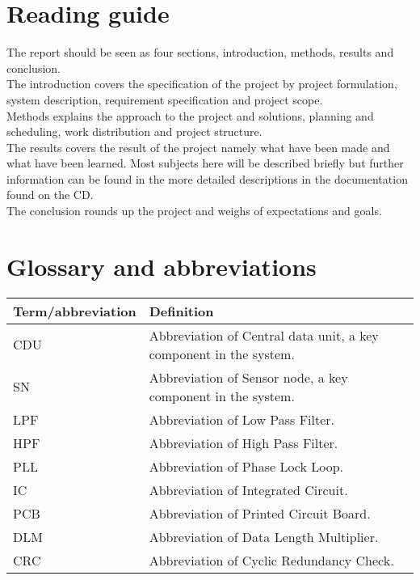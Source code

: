 \section{Reading guide}
The report should be seen as four sections, introduction, methods, results and conclusion.\\
The introduction covers the specification of the project by project formulation, system description, requirement specification and project scope.\\
Methods explains the approach to the project and solutions, planning and scheduling, work distribution and project structure.\\
The results covers the result of the project namely what have been made and what have been learned. Most subjects here will be described briefly but further information can be found in the more detailed descriptions in the documentation found on the CD.\\
The conclusion rounds up the project and weighs of expectations and goals.

\section{Glossary and abbreviations}
\begin{table}[H]
\centering
\begin{tabular}{|p{4cm}|p{7cm}|}
\hline
Term/abbreviation & Definition\\ \hline
CDU & Abbreviation of Central data unit, a key component in the system.\\ \hline
SN & Abbreviation of Sensor node, a key component in the system.\\ \hline
LPF & Abbreviation of Low Pass Filter. \\ \hline
HPF & Abbreviation of High Pass Filter. \\ \hline
PLL & Abbreviation of Phase Lock Loop. \\ \hline
IC & Abbreviation of Integrated Circuit. \\ \hline
PCB & Abbreviation of Printed Circuit Board. \\ \hline
DLM & Abbreviation of Data Length Multiplier. \\ \hline
CRC & Abbreviation of Cyclic Redundancy Check. \\ \hline
\end{tabular}
\end{table}